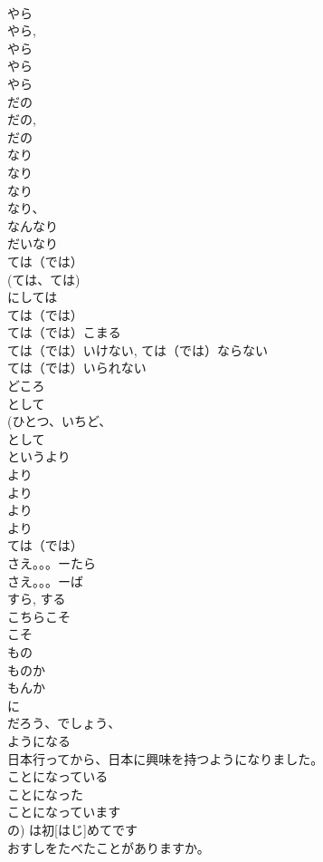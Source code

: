 \documentclass[8pt]{extreport}
\begin{document}
\begin{CJK}{UTF8}{min}
\\	やら 
\\	やら, 
\\	やら	
\\	やら	
\\	やら 
\\	だの	
\\	だの, 
\\	だの
\\	なり
\\	なり	
\\	なり
\\	なり、
\\	なんなり	
\\	だいなり	
\\	ては（では）
\\	(ては、ては)	
\\	にしては	
\\	ては（では）	
\\	ては（では）こまる	
\\	ては（では）いけない, ては（では）ならない	
\\	ては（では）いられない	
\\	どころ	
\\	として	
\\	(ひとつ、いちど、
\\	として	
\\	というより	
\\	より
\\	より	
\\	より
\\	より
\\	ては（では）
\\	さえ。。。ーたら	
\\	さえ。。。ーば	
\\	すら, する
\\	こちらこそ	
\\	こそ 
\\	もの 
\\	ものか 
\\	もんか	
\\	に 
\\	だろう、でしょう、
\\	ようになる	
\\	日本行ってから、日本に興味を持つようになりました。
\\	ことになっている	
\\	ことになった	
\\	ことになっています	
\\	の) は初[はじ]めてです	
\\	おすしをたべたことがありますか。

\end{CJK}
\end{document}
